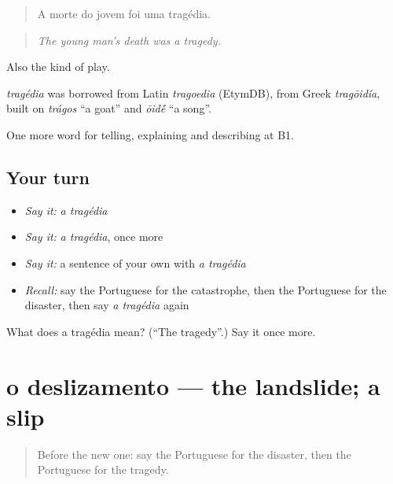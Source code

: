 \begin{quote}
A morte do jovem foi uma tragédia.
\end{quote}

\begin{quote}
\emph{The young man’s death was a tragedy.}
\end{quote}

Also the kind of play.

\begin{cousinweb}
\emph{tragédia} was borrowed from Latin \emph{tragoedia} (EtymDB), from Greek \emph{tragōidía}, built on \emph{trágos} \textquotedblleft{}a goat\textquotedblright{} and \emph{ōid\'{\={e}}} \textquotedblleft{}a song\textquotedblright{}.
\end{cousinweb}

\begin{grammarlens}[title={What you've built}]
One more word for telling, explaining and describing at B1.
\end{grammarlens}

\subsection*{Your turn}
\begin{itemize}
\raggedright
  \item \emph{Say it:} \emph{a tragédia}
  \item \emph{Say it:} \emph{a tragédia}, once more
  \item \emph{Say it:} a sentence of your own with \emph{a tragédia}
  \item \emph{Recall:} say the Portuguese for the catastrophe, then the Portuguese for the disaster, then say \emph{a tragédia} again
\end{itemize}

\begin{tcolorbox}[breakable,colback=teal!4,colframe=teal!35!black,title={Before you move on}]
What does a tragédia mean? (\textquotedblleft{}The tragedy\textquotedblright{}.) Say it once more.
\end{tcolorbox}
\section[o deslizamento]{o deslizamento — the landslide; a slip}

\label{lesson:PT-C304-deslizamento}



\begin{quote}
Before the new one: say the Portuguese for the disaster, then the Portuguese for the tragedy.
\end{quote}

